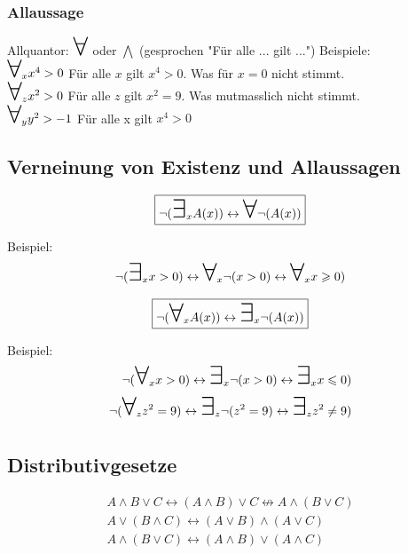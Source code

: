 \documentclass[a4paper]{scrartcl}
\newcommand\bigforall{\mbox{\huge $\forall$}}
\newcommand\bigexists{\mbox{\huge $\exists$}}
\begin{document}
\subsubsection{Allaussage}
Allquantor: $\bigforall$ oder $ \bigwedge$ (gesprochen "Für alle ... gilt ...")
Beispiele: \\
$\bigforall_x x^4 > 0 $ Für alle $x$ gilt $x^4 > 0$. Was für $x=0$ nicht stimmt. \\
$\bigforall_z x^2 > 0 $ Für alle $z$ gilt $x^2 = 9$. Was mutmasslich nicht stimmt. \\
$\bigforall_y y^2 > -1 $ Für alle x gilt $x^4 > 0$ 

\subsection{Verneinung von Existenz und Allaussagen}
\begin{align}
\boxed {
\neg (\bigexists_x A(x)) \leftrightarrow \bigforall \neg (A(x))
}
\end{align}

Beispiel: \\
\begin{align}
\neg (\bigexists_x x > 0) \leftrightarrow \bigforall_x \neg (x>0) \leftrightarrow \bigforall_x x \geqslant 0)
\end{align}

\begin{align}
\boxed{
\neg (\bigforall_x A(x)) \leftrightarrow \bigexists_x \neg (A(x))
}
\end{align}

Beispiel: \\
\begin{align}
\neg (\bigforall_x x > 0) \leftrightarrow \bigexists_x \neg (x>0) \leftrightarrow \bigexists_x x \leqslant 0) \\
\neg (\bigforall_z z^2 = 9) \leftrightarrow \bigexists_z \neg (z^2 = 9) \leftrightarrow \bigexists_z z^2 \neq 9)
\end{align}

\subsection{Distributivgesetze}
\begin{align}
\boxed {
A \wedge B \vee C \leftrightarrow (A \wedge B) \vee C \nleftrightarrow A \wedge (B \vee C)
} \\
\boxed { A \vee (B \wedge C) \leftrightarrow (A \vee B) \wedge (A \vee C) } \\
\boxed { A \wedge (B \vee C) \leftrightarrow (A \wedge B) \vee (A \wedge C) }
\end{align}
\end{document}
